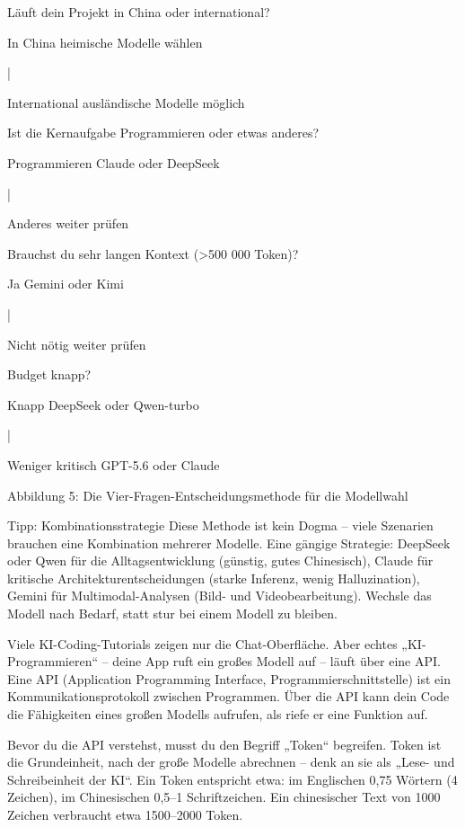 Läuft dein Projekt in China oder international?

In China heimische Modelle wählen

|

International ausländische Modelle möglich

Ist die Kernaufgabe Programmieren oder etwas anderes?

Programmieren Claude oder DeepSeek

|

Anderes weiter prüfen

Brauchst du sehr langen Kontext (>500 000 Token)?

Ja Gemini oder Kimi

|

Nicht nötig weiter prüfen

Budget knapp?

Knapp DeepSeek oder Qwen-turbo

|

Weniger kritisch GPT-5.6 oder Claude

\begin{center}\small\color{gray}Abbildung 5: Die Vier-Fragen-Entscheidungsmethode für die Modellwahl\end{center}

\begin{tcbinfo}{Tipp: Kombinationsstrategie}
Diese Methode ist kein Dogma – viele Szenarien brauchen eine Kombination mehrerer Modelle. Eine gängige Strategie: DeepSeek oder Qwen für die Alltagsentwicklung (günstig, gutes Chinesisch), Claude für kritische Architekturentscheidungen (starke Inferenz, wenig Halluzination), Gemini für Multimodal-Analysen (Bild- und Videobearbeitung). Wechsle das Modell nach Bedarf, statt stur bei einem Modell zu bleiben.

\end{tcbinfo}


Viele KI-Coding-Tutorials zeigen nur die Chat-Oberfläche. Aber echtes „KI-Programmieren“ – deine App ruft ein großes Modell auf – läuft über eine API. Eine API (Application Programming Interface, Programmierschnittstelle) ist ein Kommunikationsprotokoll zwischen Programmen. Über die API kann dein Code die Fähigkeiten eines großen Modells aufrufen, als riefe er eine Funktion auf.


Bevor du die API verstehst, musst du den Begriff „Token“ begreifen. Token ist die Grundeinheit, nach der große Modelle abrechnen – denk an sie als „Lese- und Schreibeinheit der KI“. Ein Token entspricht etwa: im Englischen 0,75 Wörtern (4 Zeichen), im Chinesischen 0,5–1 Schriftzeichen. Ein chinesischer Text von 1000 Zeichen verbraucht etwa 1500–2000 Token.

